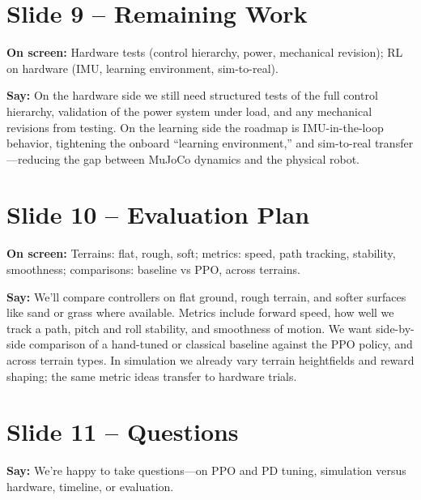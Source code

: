 \documentclass[11pt]{article}
\begin{document}
\section{Slide 9 -- Remaining Work}
\textbf{On screen:} Hardware tests (control hierarchy, power, mechanical revision); RL on hardware (IMU, learning environment, sim-to-real).

\textbf{Say:}
On the hardware side we still need structured tests of the full control hierarchy, validation of the power system under load, and any mechanical revisions from testing. On the learning side the roadmap is IMU-in-the-loop behavior, tightening the onboard ``learning environment,'' and sim-to-real transfer---reducing the gap between MuJoCo dynamics and the physical robot.

\section{Slide 10 -- Evaluation Plan}
\textbf{On screen:} Terrains: flat, rough, soft; metrics: speed, path tracking, stability, smoothness; comparisons: baseline vs PPO, across terrains.

\textbf{Say:}
We'll compare controllers on flat ground, rough terrain, and softer surfaces like sand or grass where available. Metrics include forward speed, how well we track a path, pitch and roll stability, and smoothness of motion. We want side-by-side comparison of a hand-tuned or classical baseline against the PPO policy, and across terrain types. In simulation we already vary terrain heightfields and reward shaping; the same metric ideas transfer to hardware trials.

\section{Slide 11 -- Questions}
\textbf{Say:}
We're happy to take questions---on PPO and PD tuning, simulation versus hardware, timeline, or evaluation.

\newpage
\appendix
\end{document}
